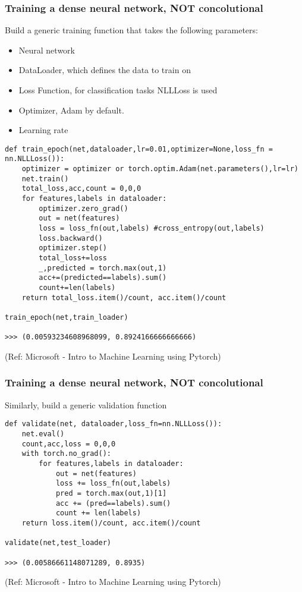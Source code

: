 \begin{frame}[fragile] \frametitle{Training a dense neural network, NOT concolutional}

Build a generic training function that takes the following parameters:

\begin{itemize}
\item Neural network
\item DataLoader, which defines the data to train on
\item Loss Function, for classification tasks NLLLoss is used
\item Optimizer, Adam by default.
\item Learning rate 
\end{itemize}

\begin{lstlisting}
def train_epoch(net,dataloader,lr=0.01,optimizer=None,loss_fn = nn.NLLLoss()):
    optimizer = optimizer or torch.optim.Adam(net.parameters(),lr=lr)
    net.train()
    total_loss,acc,count = 0,0,0
    for features,labels in dataloader:
        optimizer.zero_grad()
        out = net(features)
        loss = loss_fn(out,labels) #cross_entropy(out,labels)
        loss.backward()
        optimizer.step()
        total_loss+=loss
        _,predicted = torch.max(out,1)
        acc+=(predicted==labels).sum()
        count+=len(labels)
    return total_loss.item()/count, acc.item()/count

train_epoch(net,train_loader)

>>> (0.00593234608968099, 0.8924166666666666)

\end{lstlisting}


\tiny{(Ref: Microsoft - Intro to Machine Learning using Pytorch)}
\end{frame}

\begin{frame}[fragile] \frametitle{Training a dense neural network, NOT concolutional}

Similarly, build a generic validation function 

\begin{lstlisting}
def validate(net, dataloader,loss_fn=nn.NLLLoss()):
    net.eval()
    count,acc,loss = 0,0,0
    with torch.no_grad():
        for features,labels in dataloader:
            out = net(features)
            loss += loss_fn(out,labels) 
            pred = torch.max(out,1)[1]
            acc += (pred==labels).sum()
            count += len(labels)
    return loss.item()/count, acc.item()/count

validate(net,test_loader)

>>> (0.00586661148071289, 0.8935)
\end{lstlisting}


\tiny{(Ref: Microsoft - Intro to Machine Learning using Pytorch)}
\end{frame}

